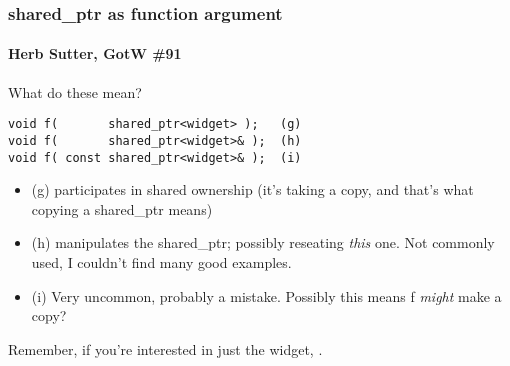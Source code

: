 
\begin{frame}[fragile]
\frametitle{shared\_ptr as function argument}
\framesubtitle{Herb Sutter, GotW \#91}
What do these mean?
{\scriptsize\begin{verbatim}
void f(       shared_ptr<widget> );   (g)
void f(       shared_ptr<widget>& );  (h)
void f( const shared_ptr<widget>& );  (i)
\end{verbatim}
}
\begin{itemize}
\pause{}
\item (g) participates in shared ownership (it's taking a copy, and that's what
  copying a shared\_ptr means)
\pause{}
\item (h) manipulates the shared\_ptr; possibly reseating \emph{this}
  one.  Not commonly used, I couldn't find many good examples.
\pause{}
\item (i) Very uncommon, probably a mistake.  Possibly this means f \emph{might} make a copy?
\end{itemize}
\vskip 12pt
\pause{}
Remember, if you're interested in just the widget, .


\end{frame}

